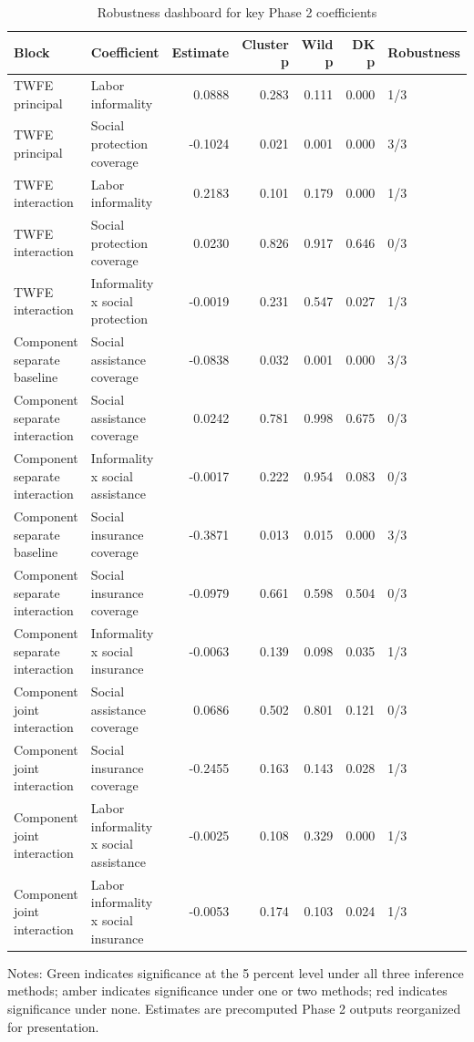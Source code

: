 \begin{table}
\centering
{}
\caption{Robustness dashboard for key Phase 2 coefficients}
\begin{tabular}{llrrrrl}
\hline
Block & Coefficient & Estimate & Cluster p & Wild p & DK p & Robustness \\
\hline
TWFE principal & Labor informality & 0.0888 & 0.283 & 0.111 & 0.000 & \cellcolor{robustamber}1/3 \\
TWFE principal & Social protection coverage & -0.1024 & 0.021 & 0.001 & 0.000 & \cellcolor{robustgreen}3/3 \\
TWFE interaction & Labor informality & 0.2183 & 0.101 & 0.179 & 0.000 & \cellcolor{robustamber}1/3 \\
TWFE interaction & Social protection coverage & 0.0230 & 0.826 & 0.917 & 0.646 & \cellcolor{robustred}0/3 \\
TWFE interaction & Informality x social protection & -0.0019 & 0.231 & 0.547 & 0.027 & \cellcolor{robustamber}1/3 \\
Component separate baseline & Social assistance coverage & -0.0838 & 0.032 & 0.001 & 0.000 & \cellcolor{robustgreen}3/3 \\
Component separate interaction & Social assistance coverage & 0.0242 & 0.781 & 0.998 & 0.675 & \cellcolor{robustred}0/3 \\
Component separate interaction & Informality x social assistance & -0.0017 & 0.222 & 0.954 & 0.083 & \cellcolor{robustred}0/3 \\
Component separate baseline & Social insurance coverage & -0.3871 & 0.013 & 0.015 & 0.000 & \cellcolor{robustgreen}3/3 \\
Component separate interaction & Social insurance coverage & -0.0979 & 0.661 & 0.598 & 0.504 & \cellcolor{robustred}0/3 \\
Component separate interaction & Informality x social insurance & -0.0063 & 0.139 & 0.098 & 0.035 & \cellcolor{robustamber}1/3 \\
Component joint interaction & Social assistance coverage & 0.0686 & 0.502 & 0.801 & 0.121 & \cellcolor{robustred}0/3 \\
Component joint interaction & Social insurance coverage & -0.2455 & 0.163 & 0.143 & 0.028 & \cellcolor{robustamber}1/3 \\
Component joint interaction & Labor informality x social assistance & -0.0025 & 0.108 & 0.329 & 0.000 & \cellcolor{robustamber}1/3 \\
Component joint interaction & Labor informality x social insurance & -0.0053 & 0.174 & 0.103 & 0.024 & \cellcolor{robustamber}1/3 \\
\hline
\end{tabular}
\begin{minipage}{0.95\linewidth}
\footnotesize Notes: Green indicates significance at the 5 percent level under all three inference methods; amber indicates significance under one or two methods; red indicates significance under none. Estimates are precomputed Phase 2 outputs reorganized for presentation.
\end{minipage}
\end{table}
